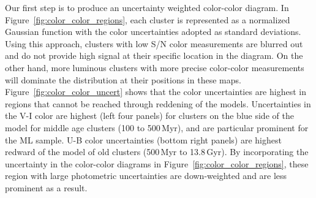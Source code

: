\documentclass[linenumbers]{aastex63}
\begin{document}
{Our first step is to produce an uncertainty weighted color-color diagram. In Figure~\ref{fig:color_color_regions}, each cluster is represented as a 
normalized Gaussian function with the color uncertainties adopted as standard deviations. Using this approach, clusters with low S/N color measurements are blurred out and do not provide high signal at their specific location in the diagram. On the other hand, more luminous clusters with more precise color-color measurements will dominate the distribution at their positions in these maps.  Figure~\ref{fig:color_color_uncert} shows that the color uncertainties are highest in regions that cannot be reached through reddening of the  models.
Uncertainties in the V-I color are highest (left four panels) for clusters on the blue side of the  model for middle age clusters (100 to 500\,Myr), and are particular prominent for the ML sample.   U-B color uncertainties (bottom right panels) are highest redward of the  model of old clusters (500\,Myr to 13.8\,Gyr). %
By incorporating the uncertainty in the color-color diagrams in Figure~\ref{fig:color_color_regions}, these region with large photometric uncertainties are down-weighted and are less prominent as a result.  





}
\end{document}
